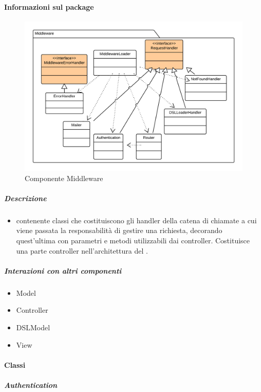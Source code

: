   \paragraph{Informazioni sul package} 
    \begin{figure}[H] 
      \begin{center} 
        \includegraphics[width=\textwidth]{uml/package/Back-end::Lib::Controller::Middleware.png}  
        \caption{Componente Middleware}
      \end{center}  
    \end{figure} 
  \subparagraph{Descrizione} 
    \begin{itemize}
    \item[]  contenente classi che costituiscono gli handler della catena di chiamate a cui viene
passata la responsabilità di gestire una richiesta, decorando quest’ultima con parametri e
metodi utilizzabili dai controller. Costituisce una parte controller nell’architettura 
del  .

    \end{itemize} 
  \subparagraph{Interazioni con altri componenti} 
    \begin{itemize} 
        \item Model
        \item Controller
        \item DSLModel
        \item View  
    \end{itemize} 
    \paragraph{Classi}
      \subparagraph{Authentication}
        
